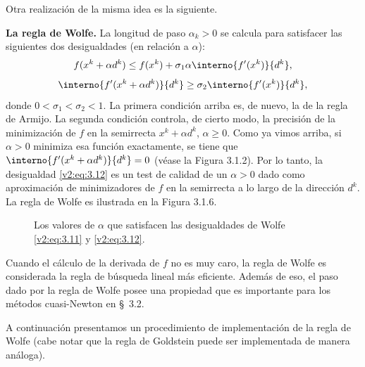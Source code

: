 Otra realización de la misma idea es la siguiente.

\textbf{La regla de Wolfe.} La longitud de paso $\alpha_k > 0$ se calcula para satisfacer las siguientes dos desigualdades (en relación a $\alpha$):
\begin{equation}
    f(x^k + \alpha d^k) \le f(x^k) + \sigma_1 \alpha \interno{f'(x^k)}{d^k},
    \label{v2:eq:3.11}
\end{equation}
\begin{equation}
    \interno{f'(x^k + \alpha d^k)}{d^k} \ge \sigma_2 \interno{f'(x^k)}{d^k},
    \label{v2:eq:3.12}
\end{equation}
donde $0 < \sigma_1 < \sigma_2 < 1$. La primera condición arriba es, de nuevo, la de la regla de Armijo. La segunda condición controla, de cierto modo, la precisión de la minimización de $f$ en la semirrecta $x^k + \alpha d^k$, $\alpha \ge 0$. Como ya vimos arriba, si $\alpha > 0$ minimiza esa función exactamente, se tiene que $\interno{f'(x^k + \alpha d^k)}{d^k} = 0$ (véase la Figura 3.1.2). Por lo tanto, la desigualdad \eqref{v2:eq:3.12} es un test de calidad de un $\alpha > 0$ dado como aproximación de minimizadores de $f$ en la semirrecta a lo largo de la dirección $d^k$. La regla de Wolfe es ilustrada en la Figura 3.1.6.

\begin{figure}[htpb]
    \centering
    \caption{Los valores de $\alpha$ que satisfacen las desigualdades de Wolfe \eqref{v2:eq:3.11} y \eqref{v2:eq:3.12}.}
    \label{v2:fig:3.1.6}
\end{figure}

Cuando el cálculo de la derivada de $f$ no es muy caro, la regla de Wolfe es considerada la regla de búsqueda lineal más eficiente. Además de eso, el paso dado por la regla de Wolfe posee una propiedad que es importante para los métodos cuasi-Newton en \S~3.2.

A continuación presentamos un procedimiento de implementación de la regla de Wolfe (cabe notar que la regla de Goldstein puede ser implementada de manera análoga).

